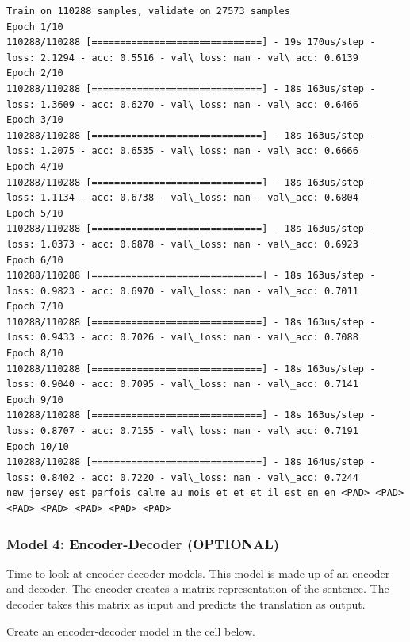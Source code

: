\documentclass[11pt]{article}
\begin{document}
    \begin{Verbatim}[commandchars=\\\{\}]
Train on 110288 samples, validate on 27573 samples
Epoch 1/10
110288/110288 [==============================] - 19s 170us/step - loss: 2.1294 - acc: 0.5516 - val\_loss: nan - val\_acc: 0.6139
Epoch 2/10
110288/110288 [==============================] - 18s 163us/step - loss: 1.3609 - acc: 0.6270 - val\_loss: nan - val\_acc: 0.6466
Epoch 3/10
110288/110288 [==============================] - 18s 163us/step - loss: 1.2075 - acc: 0.6535 - val\_loss: nan - val\_acc: 0.6666
Epoch 4/10
110288/110288 [==============================] - 18s 163us/step - loss: 1.1134 - acc: 0.6738 - val\_loss: nan - val\_acc: 0.6804
Epoch 5/10
110288/110288 [==============================] - 18s 163us/step - loss: 1.0373 - acc: 0.6878 - val\_loss: nan - val\_acc: 0.6923
Epoch 6/10
110288/110288 [==============================] - 18s 163us/step - loss: 0.9823 - acc: 0.6970 - val\_loss: nan - val\_acc: 0.7011
Epoch 7/10
110288/110288 [==============================] - 18s 163us/step - loss: 0.9433 - acc: 0.7026 - val\_loss: nan - val\_acc: 0.7088
Epoch 8/10
110288/110288 [==============================] - 18s 163us/step - loss: 0.9040 - acc: 0.7095 - val\_loss: nan - val\_acc: 0.7141
Epoch 9/10
110288/110288 [==============================] - 18s 163us/step - loss: 0.8707 - acc: 0.7155 - val\_loss: nan - val\_acc: 0.7191
Epoch 10/10
110288/110288 [==============================] - 18s 164us/step - loss: 0.8402 - acc: 0.7220 - val\_loss: nan - val\_acc: 0.7244
new jersey est parfois calme au mois et et et il est en en <PAD> <PAD> <PAD> <PAD> <PAD> <PAD> <PAD>

    \end{Verbatim}

    \subsubsection{Model 4: Encoder-Decoder
(OPTIONAL)}\label{model-4-encoder-decoder-optional}

Time to look at encoder-decoder models. This model is made up of an
encoder and decoder. The encoder creates a matrix representation of the
sentence. The decoder takes this matrix as input and predicts the
translation as output.

Create an encoder-decoder model in the cell below.
\end{document}
